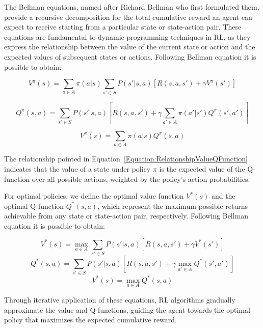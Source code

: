The Bellman equations, named after Richard Bellman who first formulated them, provide a recursive decomposition for the total cumulative reward an agent can expect to receive starting from a particular state or state-action pair. These equations are fundamental to dynamic programming techniques in RL, as they express the relationship between the value of the current state or action and the expected values of subsequent states or actions. Following Bellman equation it is possible to obtain:

\begin{equation}
V^\pi(s) = \sum_{a \in A} \pi(a|s) \sum_{s' \in S} P(s'|s,a) \left[ R(s,a,s') + \gamma V^\pi(s') \right]
\end{equation}

\begin{equation}
Q^\pi(s, a) = \sum_{s' \in S} P(s'|s,a) \left[ R(s,a,s') + \gamma \sum_{a' \in A} \pi(a'|s') Q^\pi(s', a') \right]
\end{equation}

\begin{equation}
\label{Equation:RelationshipValueQFunction}
V^\pi(s) = \sum_{a \in A} \pi(a|s) Q^\pi(s, a)
\end{equation}

The relationship pointed in Equation~\ref{Equation:RelationshipValueQFunction} indicates that the value of a state under policy \( \pi \) is the expected value of the Q-function over all possible actions, weighted by the policy's action probabilities.

For optimal policies, we define the optimal value function \( V^*(s) \) and the optimal Q-function \( Q^*(s, a) \), which represent the maximum possible returns achievable from any state or state-action pair, respectively. Following Bellman equation it is possible to obtain:

\begin{equation}
V^*(s) = \max_{a \in A} \sum_{s' \in S} P(s'|s,a) \left[ R(s,a,s') + \gamma V^*(s') \right]
\end{equation}
\begin{equation}
Q^*(s, a) = \sum_{s' \in S} P(s'|s,a) \left[ R(s,a,s') + \gamma \max_{a' \in A} Q^*(s', a') \right]
\end{equation}
\begin{equation}
V^*(s) = \max_{a \in A} Q^*(s, a)
\end{equation}

Through iterative application of these equations, RL algorithms gradually approximate the value and Q-functions, guiding the agent towards the optimal policy that maximizes the expected cumulative reward.

